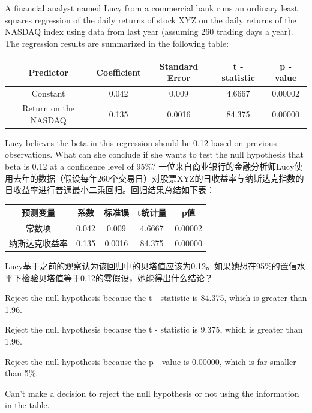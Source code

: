 \documentclass{article}
\newcounter{question} %
\begin{document}
\begin{question}
    A financial analyst named Lucy from a commercial bank runs an ordinary least squares regression of the daily returns of stock XYZ on the daily returns of the NASDAQ index using data from last year (assuming 260 trading days a year). The regression results are summarized in the following table:
    \begin{center}
    \begin{tabular}{ccccc}
    \hline
    Predictor & Coefficient & Standard Error & t - statistic & p - value \\
    \hline
    Constant & 0.042 & 0.009 & 4.6667 & 0.00002 \\
    \hline
    Return on the NASDAQ & 0.135 & 0.0016 & 84.375 & 0.00000 \\
    \hline
    \end{tabular}
    \end{center}
    Lucy believes the beta in this regression should be 0.12 based on previous observations. What can she conclude if she wants to test the null hypothesis that beta is 0.12 at a confidence level of 95\%?
    一位来自商业银行的金融分析师Lucy使用去年的数据（假设每年260个交易日）对股票XYZ的日收益率与纳斯达克指数的日收益率进行普通最小二乘回归。回归结果总结如下表：
    \begin{center}
    \begin{tabular}{ccccc}
    \hline
    预测变量 & 系数 & 标准误 & t统计量 & p值 \\
    \hline
    常数项 & 0.042 & 0.009 & 4.6667 & 0.00002 \\
    \hline
    纳斯达克收益率 & 0.135 & 0.0016 & 84.375 & 0.00000 \\
    \hline
    \end{tabular}
    \end{center}
    Lucy基于之前的观察认为该回归中的贝塔值应该为0.12。如果她想在95\%的置信水平下检验贝塔值等于0.12的零假设，她能得出什么结论？
    \end{question}
    
    \begin{choices}
        \item Reject the null hypothesis because the t - statistic is 84.375, which is greater than 1.96.
        \item Reject the null hypothesis because the t - statistic is 9.375, which is greater than 1.96.
        \item Reject the null hypothesis because the p - value is 0.00000, which is far smaller than 5\%.
        \item Can't make a decision to reject the null hypothesis or not using the information in the table.
    \end{choices}
    
\end{document}
